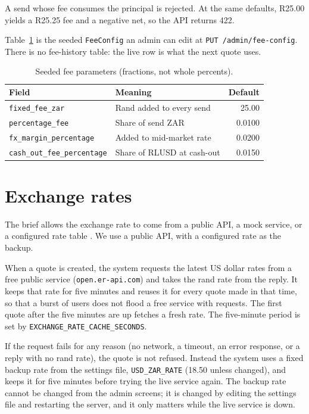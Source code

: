 \documentclass[11pt]{article}
\begin{document}
A send whose fee consumes the principal is rejected. At the same defaults, R25.00 yields a R25.25 fee and a negative net, so the API returns 422.

Table~\ref{tab:fees} is the seeded \texttt{FeeConfig} an admin can edit at \texttt{PUT /admin/fee-config}. There is no fee-history table: the live row is what the next quote uses.

\begin{table}[ht]
\centering
\caption{Seeded fee parameters (fractions, not whole percents).}
\label{tab:fees}
\begin{tabular}{@{}llr@{}}
\toprule
\textbf{Field} & \textbf{Meaning} & \textbf{Default} \\
\midrule
\texttt{fixed\_fee\_zar} & Rand added to every send & 25.00 \\
\texttt{percentage\_fee} & Share of send ZAR & 0.0100 \\
\texttt{fx\_margin\_percentage} & Added to mid-market rate & 0.0200 \\
\texttt{cash\_out\_fee\_percentage} & Share of RLUSD at cash-out & 0.0150 \\
\bottomrule
\end{tabular}
\end{table}

\section{Exchange rates}
\label{sec:fx}
The brief allows the exchange rate to come from a public API, a mock service, or a configured rate table \citep{UCTBrief2026}. We use a public API, with a configured rate as the backup.

When a quote is created, the system requests the latest US dollar rates from a free public service (\texttt{open.er-api.com}) and takes the rand rate from the reply. It keeps that rate for five minutes and reuses it for every quote made in that time, so that a burst of users does not flood a free service with requests. The first quote after the five minutes are up fetches a fresh rate. The five-minute period is set by \texttt{EXCHANGE\_RATE\_CACHE\_SECONDS}.

If the request fails for any reason (no network, a timeout, an error response, or a reply with no rand rate), the quote is not refused. Instead the system uses a fixed backup rate from the settings file, \texttt{USD\_ZAR\_RATE} (18.50 unless changed), and keeps it for five minutes before trying the live service again. The backup rate cannot be changed from the admin screens; it is changed by editing the settings file and restarting the server, and it only matters while the live service is down.
\end{document}
